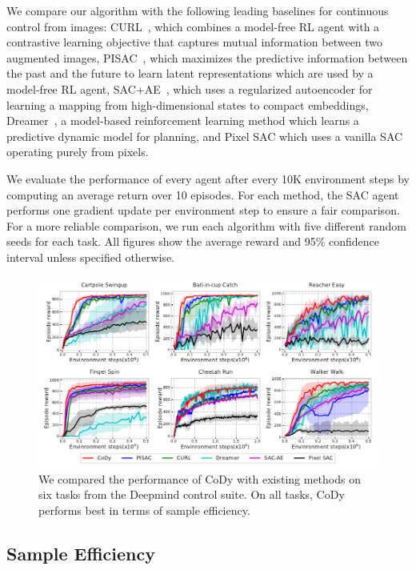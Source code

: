 \documentclass[a4paper,12pt]{article}
\begin{document}
We compare our algorithm with the following leading baselines for continuous control from images: CURL~\cite{laskin2020curl}, which combines a model-free RL agent with a contrastive learning objective that captures mutual information between two augmented images, PISAC~\cite{lee2020predictive}, which maximizes the predictive information between the past and the future to learn latent representations which are used by a model-free RL agent, SAC+AE~\cite{yarats2019improving}, which uses a regularized autoencoder for learning a mapping from high-dimensional states to compact embeddings, Dreamer~\cite{hafner2020Dream}, a model-based reinforcement learning method which learns a predictive dynamic model for planning, and Pixel SAC which uses a vanilla SAC operating purely from pixels. 

We evaluate the performance of every agent after every 10K environment steps by computing an average return over 10 episodes. For each method, the SAC agent performs one gradient update per environment step to ensure a fair comparison. For a more reliable comparison, we run each algorithm with five different random seeds for each task. All figures show the average reward and 95\% confidence interval unless specified otherwise.

\begin{figure}[t]
\centering
\includegraphics[width=\textwidth]{efficiency.pdf}
\caption{We compared the performance of CoDy with existing methods on six tasks from the Deepmind control suite. On all tasks, CoDy performs best in terms of sample efficiency.}
\label{fig:sample_efficiency}
\end{figure}

\subsection{Sample Efficiency}
\end{document}
